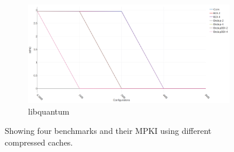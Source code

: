 \begin{figure}
    \begin{subfigure}{0.5\textwidth}
        \includegraphics[width=\textwidth]{libquantum-mpki.png}
        \caption{libquantum}
    \end{subfigure}
    \caption[Case Study: MPKI]{Showing four benchmarks and their MPKI using different compressed caches.}
    \label{fig:case_mpki}
\end{figure}
